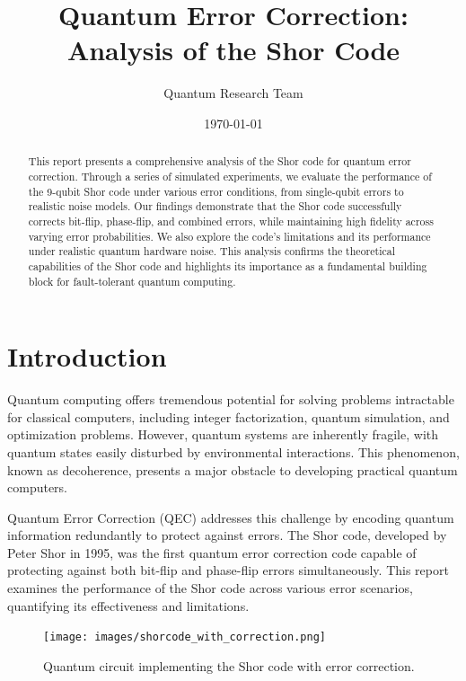 \documentclass[12pt,a4paper]{article}
\title{Quantum Error Correction: Analysis of the Shor Code}
\author{Quantum Research Team}
\date{\today}
\begin{document}
\maketitle

\begin{abstract}
    This report presents a comprehensive analysis of the Shor code for quantum error correction. Through a series of simulated experiments, we evaluate the performance of the 9-qubit Shor code under various error conditions, from single-qubit errors to realistic noise models. Our findings demonstrate that the Shor code successfully corrects bit-flip, phase-flip, and combined errors, while maintaining high fidelity across varying error probabilities. We also explore the code's limitations and its performance under realistic quantum hardware noise. This analysis confirms the theoretical capabilities of the Shor code and highlights its importance as a fundamental building block for fault-tolerant quantum computing.
\end{abstract}

\tableofcontents
\newpage

\section{Introduction}

Quantum computing offers tremendous potential for solving problems intractable for classical computers, including integer factorization, quantum simulation, and optimization problems. However, quantum systems are inherently fragile, with quantum states easily disturbed by environmental interactions. This phenomenon, known as decoherence, presents a major obstacle to developing practical quantum computers.

Quantum Error Correction (QEC) addresses this challenge by encoding quantum information redundantly to protect against errors. The Shor code, developed by Peter Shor in 1995, was the first quantum error correction code capable of protecting against both bit-flip and phase-flip errors simultaneously. This report examines the performance of the Shor code across various error scenarios, quantifying its effectiveness and limitations.

\begin{figure}[H]
    \centering
    \texttt{[image: images/shorcode\_with\_correction.png]}
    \caption{Quantum circuit implementing the Shor code with error correction.}
    \label{fig:shor_circuit}
\end{figure}
\end{document}
